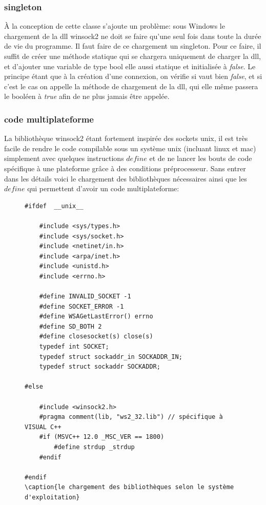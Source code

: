 \documentclass[10pt,a4paper]{report}
\begin{document}
\begin{spacing}{0.8}
\subsubsection{singleton}
À la conception de cette classe s'ajoute un problème: sous Windows le chargement de la dll winsock2 ne doit se faire qu'une seul fois dans toute la durée de vie du programme. Il faut faire de ce chargement un singleton. Pour ce faire, il suffit de créer une méthode statique qui se chargera uniquement de charger la dll, et d'ajouter une variable de type bool elle aussi statique et initialisée à \textit{false}. Le principe étant que à la création d'une connexion, on vérifie si vaut bien \textit{false}, et si c'est le cas on appelle la méthode de chargement de la dll, qui elle même passera le booléen à \textit{true} afin de ne plus jamais être appelée.

\subsubsection{code multiplateforme}
La bibliothèque winsock2 étant fortement inspirée des sockets unix, il est très facile de rendre le code compilable sous un système unix (incluant linux et mac) simplement avec quelques instructions $define$ et de ne lancer les bouts de code spécifique à une plateforme grâce à des conditions préprocesseur.
Sans entrer dans les détails voici le chargement des bibliothèques nécessaires ainsi que les $define$ qui permettent d'avoir un code multiplateforme:
\begin{figure}[H]
\begin{verbatim}
#ifdef  __unix__

    #include <sys/types.h>
    #include <sys/socket.h>
    #include <netinet/in.h>
    #include <arpa/inet.h>
    #include <unistd.h>
    #include <errno.h>

    #define INVALID_SOCKET -1
    #define SOCKET_ERROR -1
    #define WSAGetLastError() errno
    #define SD_BOTH 2
    #define closesocket(s) close(s)
    typedef int SOCKET;
    typedef struct sockaddr_in SOCKADDR_IN;
    typedef struct sockaddr SOCKADDR;

#else

    #include <winsock2.h>
    #pragma comment(lib, "ws2_32.lib") // spécifique à VISUAL C++
    #if (MSVC++ 12.0 _MSC_VER == 1800)
        #define strdup _strdup
    #endif

#endif
\caption{le chargement des bibliothèques selon le système d'exploitation}
\end{verbatim}
\end{figure}



\end{spacing}
\end{document}
